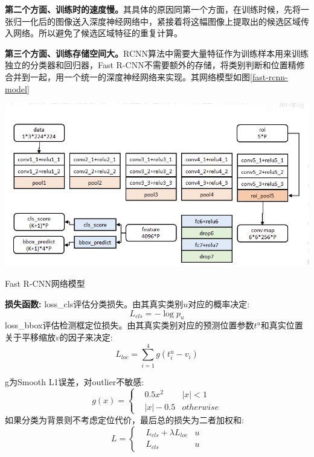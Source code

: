 \textbf{第二个方面、训练时的速度慢。}其具体的原因同第一个方面，在训练时候，先将一张归一化后的图像送入深度神经网络中，紧接着将这幅图像上提取出的候选区域传入网络。所以避免了候选区域特征的重复计算。

\textbf{第三个方面、训练存储空间大。}RCNN算法中需要大量特征作为训练样本用来训练独立的分类器和回归器，Fast R-CNN不需要额外的存储，将类别判断和位置精修合并到一起，用一个统一的深度神经网络来实现。其网络模型如图\ref{fast-rcnn-model}

\begin{uscfigure}
	\includegraphics[width=\textwidth]{./Pictures/fast-rcnn-model.png}	
	\caption{Fast R-CNN网络模型}	
	\label{fast-rcnn-model}
\end{uscfigure}

\textbf{损失函数:}
loss\_cls评估分类损失。由其真实类别$u$对应的概率决定:
\begin{equation}
	L_{cls} = - \log p_u
\end{equation}
loss\_bbox评估检测框定位损失。由其真实类别对应的预测位置参数$t^u$和真实位置关于平移缩放$v$的因子来决定:
\begin{equation}
	L_{loc} = \sum_{i=1}^{4} g(t_i^u - v_i)
\end{equation}
	
g为Smooth L1误差，对outlier不敏感:
\begin{equation}
	g(x) = \left \{
		\begin{aligned}
		& 0.5x^2 	 & |x| < 1	\\	
		& |x| - 0.5  &otherwise
		\end{aligned}
		\right .
\end{equation}
如果分类为背景则不考虑定位代价，最后总的损失为二者加权和:
\begin{equation}
	L = \left \{
		\begin{aligned}
		& L_{cls} + \lambda L_{loc} & u\\
		& L_{cls} 					& u
		\end{aligned}
	\right .
\end{equation}
